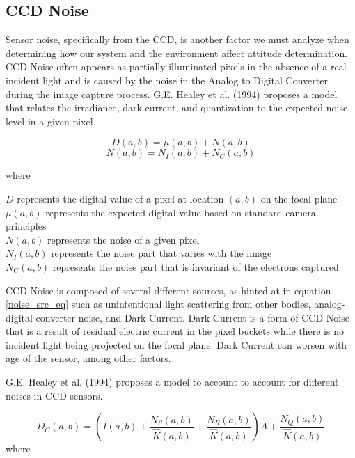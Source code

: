 \subsection*{CCD Noise}
\par \qquad Sensor noise, specifically from the CCD, is another factor we must analyze when determining how our system and the environment affect attitude determination.
CCD Noise often appears as partially illuminated pixels in the absence of a real incident light and is caused by the noise in the Analog to Digital Converter during the image capture process.
G.E. Healey et al. (1994) proposes a model that relates the irradiance, dark current, and quantization to the expected noise level in a given pixel\cite{radiometric_ccd_camera_calibration}.

\begin{equation}
    D(a,b) = \mu(a,b) + N(a,b)
\end{equation}
\begin{equation} \label{noise_src_eq}
    N(a,b) = N_I(a,b) + N_C(a,b)
\end{equation}

where
\begin{center}
    $D$ represents the digital value of a pixel at location $(a,b)$ on the focal plane\\
    $\mu(a,b)$ represents the expected digital value based on standard camera principles\\
    $N(a,b)$ represents the noise of a given pixel\\
    $N_I(a,b)$ represents the noise part that varies with the image\\
    $N_C(a,b)$ represents the noise part that is invariant of the electrons captured
\end{center}

CCD Noise is composed of several different sources, as hinted at in equation \ref{noise_src_eq} such as unintentional light scattering from other bodies, analog-digital converter noise, and Dark Current.
Dark Current is a form of CCD Noise that is a result of residual electric current in the pixel buckets while there is no incident light being projected on the focal plane.
Dark Current can worsen with age of the sensor, among other factors.

\par \qquad G.E. Healey et al. (1994) proposes a model to account to account for different noises in CCD sensors.

\begin{equation} \label{noise_correction_eq}
    D_C(a,b) = \left( I(a,b) + \frac{N_S(a,b)}{\hat{K}(a,b)} + \frac{N_R(a,b)}{\hat{K}(a,b)} \right)A + \frac{N_Q(a,b)}{\hat{K}(a,b)}
\end{equation}
where


